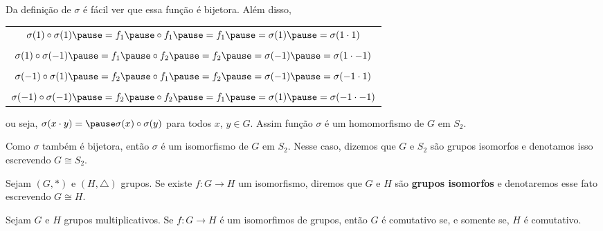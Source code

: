 \documentclass{beamer}
\begin{document}
    \begin{frame}
        Da defini\c{c}\~ao de $\sigma$ \pause \'e f\'acil ver que essa fun\c{c}\~ao \'e bijetora. \pause Al\'em disso, \pause
        \begin{center}
            \begin{tabular}{c}
                $\sigma(1) \circ \sigma(1) \pause = f_1 \pause \circ f_1 \pause = f_1 \pause = \sigma(1) \pause = \sigma(1 \cdot 1)$\pause\\
                \\
                $\sigma(1) \circ \sigma(-1) \pause = f_1 \pause \circ f_2 \pause = f_2 \pause = \sigma(-1) \pause = \sigma(1 \cdot -1)$ \pause\\
                \\
                $\sigma(-1) \circ \sigma(1) \pause = f_2 \pause \circ f_1 \pause = f_2 \pause = \sigma(-1) \pause = \sigma(-1 \cdot 1)$ \pause\\
                \\
                $\sigma(-1) \circ \sigma(-1) \pause = f_2 \pause \circ f_2 \pause = f_1 \pause = \sigma(1) \pause = \sigma(-1 \cdot -1)$ \pause\\
            \end{tabular}
        \end{center}
        ou seja, $\sigma(x\cdot y) = \pause \sigma(x) \circ \sigma(y)$ \pause para todos $x$, $y \in G$. \pause Assim fun\c{c}\~ao $\sigma$ \'e um homomorfismo de $G$ em $S_2$. \pause

        \vspace{.3cm}

        Como $\sigma$ tamb\'em \'e bijetora, \pause ent\~ao $\sigma$ \'e um isomorfismo \pause de $G$ em $S_2$. \pause Nesse caso, dizemos que $G$ e $S_2$ s\~ao grupos isomorfos \pause e denotamos isso escrevendo $G \cong S_2$.
    \end{frame}

    \begin{frame}
        \begin{definicao}
            Sejam $(G, *)$ e $(H, \triangle)$ grupos. \pause Se existe $f : G \to H$ um isomorfismo, \pause diremos que $G$ e $H$ s\~ao \textbf{grupos isomorfos} \pause e denotaremos esse fato escrevendo $G \cong H$. \pause
        \end{definicao}
    \end{frame}

    \begin{frame}
        \begin{proposicao}
            Sejam $G$ e $H$ grupos multiplicativos. \pause Se $f : G \to H$ \'e um isomorfimos de grupos, ent\~ao \pause $G$ \'e comutativo se, e somente se, $H$ \'e comutativo. \pause
        \end{proposicao}
    \end{frame}
\end{document}
